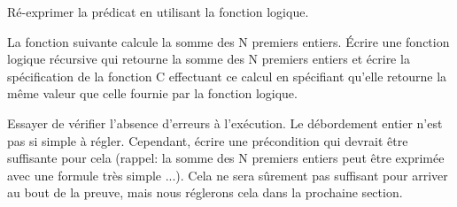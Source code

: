 

Ré-exprimer la prédicat  en utilisant la fonction logique.



\label{l4:acsl-properties-functions-n-first-ints}


La fonction suivante calcule la somme des N premiers entiers. Écrire une fonction
logique récursive qui retourne la somme des N premiers entiers et écrire
la spécification de la fonction C effectuant ce calcul en spécifiant qu'elle
retourne la même valeur que celle fournie par la fonction logique.




Essayer de vérifier l'absence d'erreurs à l'exécution. Le débordement entier
n'est pas si simple à régler. Cependant, écrire une précondition qui devrait
être suffisante pour cela (rappel: la somme des N premiers entiers peut être
exprimée avec une formule très simple ...). Cela ne sera sûrement pas suffisant
pour arriver au bout de la preuve, mais nous réglerons cela dans la prochaine
section.
